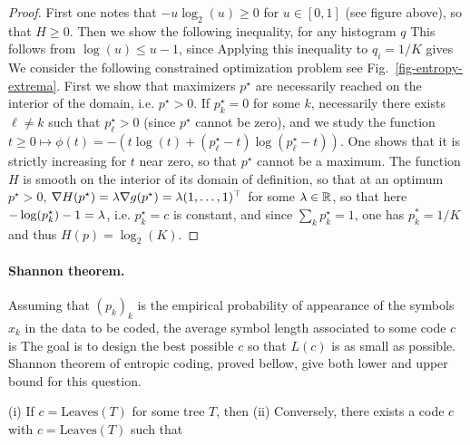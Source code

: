 \begin{proof}
	First one notes that $-u\log_2(u) \geq 0$ for $u \in [0,1]$ (see figure above), so that $H \geq 0$.
	Then we show the following inequality, for any histogram $q$ 
	This follows from $\log(u) \leq u-1$, since
	Applying this inequality to $q_i=1/K$ gives
	We consider the following constrained optimization problem
	see Fig.~\ref{fig-entropy-extrema}.
	First we show that maximizers $p^\star$ are necessarily reached on the interior of the domain, i.e. $p^\star>0$.
	If $p_k^\star=0$ for some $k$, necessarily there exists $\ell \neq k$ such that $p_\ell^\star>0$ (since $p^\star$ cannot be zero), and we study the function 
	$t \geq 0 \mapsto \phi(t) = - ( t \log(t) + (p_\ell^\star-t) \log(p_\ell^\star-t) )$. One shows that it is strictly increasing for $t$ near zero, so that $p^\star$ cannot be a maximum.	
	The function $H$ is smooth on the interior of its domain of definition, so that 
	at an optimum $p^\star>0$, $\nabla H(p^\star)=\lambda \nabla g(p^\star) = \lambda (1,\ldots,1)^\top$ for some $\lambda \in \mathbb{R}$, so that here $-\log(p_k^\star)-1 = \lambda$, i.e. $p_k^\star=c$ is constant, and since  $\sum_k p_k^\star=1$, one has $p_k^*=1/K$ and thus $H(p)=\log_2(K)$.
	\fi
\end{proof}


\paragraph{Shannon theorem.}

%
Assuming that $(p_k)_k$ is the empirical probability of appearance of the symbols $x_k$ in the data to be coded, the average symbol length associated to some code $c$ is 
The goal is to design the best possible $c$ so that $L(c)$ is as small as possible.
%
Shannon theorem of entropic coding, proved bellow, give both lower and upper bound for this question. 

\begin{thm}
	(i) If $c=\text{Leaves}(T)$ for some tree $T$, then 
	(ii) Conversely, there exists a code $c$ with $c=\text{Leaves}(T)$ such that 
\end{thm} 

